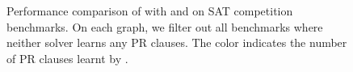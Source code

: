 \begin{figure}[!t]
\begin{subfigure}[t]{0.45\textwidth}
        \label{subfig:cautical-vs-prelearn-performance}
    \end{subfigure}
    \caption{Performance comparison of \tool with \prelearn and \cadical on SAT competition benchmarks. On each graph, we filter out all benchmarks where neither solver learns any PR clauses. The color indicates the number of PR clauses learnt by \tool.}
    \label{fig:solver-comparison}
\end{figure}

